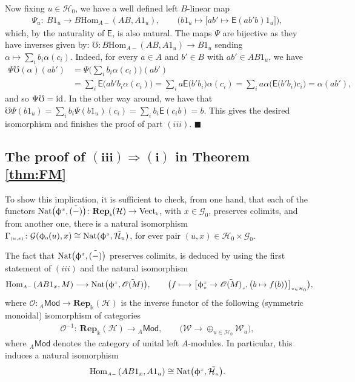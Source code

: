 \documentclass[pdftex]{sigma}
\numberwithin{equation}{section}
\newcommand{\Sf}[1]{\mathsf{#1}}
\newcommand{\lmod}[1]{{}_{#1}\Sf{Mod}}
\renewcommand{\hom}[3]{\mathrm{Hom}_{\Sscript{#1}}\left(#2, #3\right)}
\newcommand{\Rep}[1]{\mathbf{Rep}_{\Sscript{\Bbbk}}(#1)}
\newcommand{\Vect}{{\rm Vect}_{\Sscript{\Bbbk}}}
\newcommand{\Go}{\cG_{\Sscript{0}}}
\newcommand{\Ho}{\cH_{\Sscript{0}}}
\newcommand{\Wu}{\cW_{\Sscript{u}}}
\newcommand{\oO}{\mathscr{O}}
\newcommand{\cG}{{\mathcal G}}
\newcommand{\cH}{{\mathcal H}}
\newcommand{\cW}{{\mathcal W}}
\newcommand{\Sscript}[1]{\scriptscriptstyle{#1}}
\newcommand{\phio}{\upphi_{\Sscript{0}}}
\newcommand*{\QEDA}{\hfill\ensuremath{\blacksquare}}%
\begin{document}
Now fixing $u \in \Ho$, we have a well defined left $B$-linear map
\begin{gather*}
\Psi_{u}\colon \ B1_{u} \longrightarrow B\hom{A-}{AB}{A1_{u}}, \qquad \big( b1_{u} \longmapsto \big[ ab' \mapsto \Sf{E}(ab'b) 1_{u} \big] \big),
\end{gather*}
which, by the naturality of $\Sf{E}$, is also natural. The maps $\Psi$ are bijective as they have inverses given by: $\mho\colon B\hom{A-}{AB}{A1_{u}} \to B1_{u}$ sending $\alpha \mapsto \sum_{i}b_{i}\alpha(c_{i})$. Indeed, for every $a \in A$ and $b' \in B$ with $ab' \in AB1_{u}$, we have
\begin{align*}
\Psi\mho(\alpha) (ab') &= \Psi\bigg( \sum_{i} b_{i}\alpha(c_{i})\bigg) (ab') \\
&= \sum_{i} \Sf{E}\big( ab'b_{i}\alpha(c_{i})\big) = \sum_{i} a \Sf{E}\big(b'b_{i}\big)\alpha(c_{i}) = \sum_{i} a \alpha\big( \Sf{E}\big( b'b_{i}\big)c_{i}\big) = \alpha(ab'),
\end{align*}
and so $\Psi\mho={\rm id}$. In the other way around, we have that $\mho \Psi(b1_{u}) = \sum_{i}b_{i}\Psi(b1_{u})(c_{i}) = \sum_{i} b_{i}\Sf{E}(c_{i}b) = b$. This gives the desired isomorphism and finishes the proof of part $(iii)$. \QEDA

\subsection[The proof of $(iii) \Rightarrow (i)$ in Theorem \ref{thm:FM}]{The proof of $\boldsymbol{(iii) \Rightarrow (i)}$ in Theorem \ref{thm:FM}}\label{sssec:III-IV}
To show this implication, it is sufficient to check, from one hand, that each of the functors ${\rm Nat}\big(\upphi^{\Sscript{x}}, \tilde{(-)}\big)\colon \Rep{\cH} \to \Vect$, with $x \in \Go$, preserves colimits, and from another one, there is a natural isomorphism $\Gamma_{\Sscript{(u, x)}}\colon \cG(\phio(u), x) \cong {\rm Nat}(\upphi^{\Sscript{x}}, \tilde{\cH_{u}})$, for ever pair $(u, x) \in \Ho \times \Go$.

The fact that ${\rm Nat}\big(\upphi^{\Sscript{x}}, \tilde{(-)}\big)$ preserves colimits, is deduced by using the first statement of $(iii)$ and the natural isomorphism
\begin{gather}\label{Eq:Calentaminetoglobal}
\hom{A-}{AB1_{x}}{M} \longrightarrow {\rm Nat}\big(\upphi^{\Sscript{x}}, \tilde{\oO(M)}\big),\qquad \big( f \longmapsto \big[ \upphi^{\Sscript{x}}_{\Sscript{v}} \to \tilde{\oO(M)}_{\Sscript{v}}, \big( b \mapsto f(b)
\big)\big]_{\Sscript{v \in \Ho}} \big),\!\!\!
\end{gather}
where $\oO\colon \lmod{A} \to \Rep{\cH}$ is the inverse functor of the following (symmetric monoidal) isomorphism of categories
\begin{gather*}
\oO^{-1}\colon \ \Rep{\cH} \longrightarrow \lmod{A}, \qquad \big( \cW \longrightarrow \oplus_{u \in \Ho} \Wu \big),
\end{gather*}
where $\lmod{A}$ denotes the category of unital left $A$-modules. In particular, this induces a natural isomorphism
\begin{gather*}
\hom{A-}{AB1_{x}}{A1_{u}} \cong {\rm Nat}\big(\upphi^{\Sscript{x}}, \tilde{\cH_{\Sscript{u}}}\big).
\end{gather*}
\end{document}
